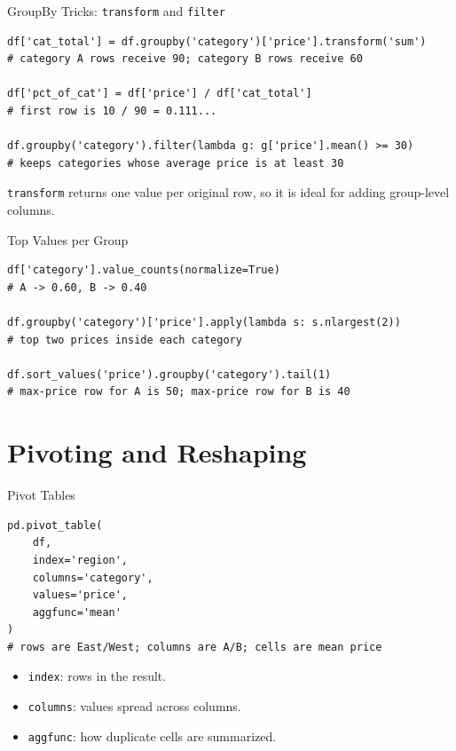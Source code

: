 \documentclass[11pt,aspectratio=43]{beamer}
\begin{document}
\begin{frame}[fragile]{GroupBy Tricks: \texttt{transform} and \texttt{filter}}
  \begin{lstlisting}
df['cat_total'] = df.groupby('category')['price'].transform('sum')
# category A rows receive 90; category B rows receive 60

df['pct_of_cat'] = df['price'] / df['cat_total']
# first row is 10 / 90 = 0.111...

df.groupby('category').filter(lambda g: g['price'].mean() >= 30)
# keeps categories whose average price is at least 30
  \end{lstlisting}
  \texttt{transform} returns one value per original row, so it is ideal for adding group-level columns.
\end{frame}

\begin{frame}[fragile]{Top Values per Group}
  \begin{lstlisting}
df['category'].value_counts(normalize=True)
# A -> 0.60, B -> 0.40

df.groupby('category')['price'].apply(lambda s: s.nlargest(2))
# top two prices inside each category

df.sort_values('price').groupby('category').tail(1)
# max-price row for A is 50; max-price row for B is 40
  \end{lstlisting}
\end{frame}

\section{Pivoting and Reshaping}

\begin{frame}[fragile]{Pivot Tables}
  \begin{lstlisting}
pd.pivot_table(
    df,
    index='region',
    columns='category',
    values='price',
    aggfunc='mean'
)
# rows are East/West; columns are A/B; cells are mean price
  \end{lstlisting}
  \begin{itemize}
    \item \texttt{index}: rows in the result.
    \item \texttt{columns}: values spread across columns.
    \item \texttt{aggfunc}: how duplicate cells are summarized.
  \end{itemize}
\end{frame}
\end{document}
